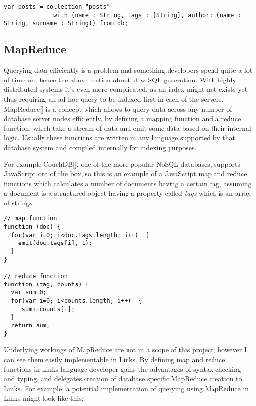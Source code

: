 \begin{codelisting}
\begin{verbatim}
var posts = collection "posts" 
			  with (name : String, tags : [String], author: (name : String, surname : String)) from db;
\end{verbatim}
\end{codelisting}

\subsection{MapReduce}

Querying data efficiently is a problem and something developers spend quite a lot of time on, hence the above section about slow SQL generation. With highly distributed systems it's even more complicated, as an index might not exists yet thus requiring an ad-hoc query to be indexed first in each of the servers. MapReduce[] is a concept which allows to query data across any number of database server nodes efficiently, by defining a mapping function and a reduce function, which take a stream of data and emit some data based on their internal logic. Usually these functions are written in any language supported by that database system and compiled internally for indexing purposes.

For example CouchDB[], one of the more popular NoSQL databases, supports JavaScript out of the box, so this is an example of a JavaScript map and reduce functions which calculates a number of documents having a certain tag, assuming a document is a structured object having a property called \textit{tags} which is an array of strings:

\begin{codelisting}
\begin{verbatim}
// map function
function (doc) { 
  for(var i=0; i<doc.tags.length; i++)  {
    emit(doc.tags[i], 1); 
  }
}

// reduce function
function (tag, counts) {
  var sum=0; 
  for(var i=0; i<counts.length; i++)  {
     sum+=counts[i];
  }
  return sum; 
}
\end{verbatim}
\end{codelisting}

Underlying workings of MapReduce are not in a scope of this project, however I can see them easily implementable in Links. By defining map and reduce functions in Links language developer gains the advantages of syntax checking and typing, and delegates creation of database specific MapReduce creation to Links. For example, a potential implementation of querying using MapReduce in Links might look like this:

